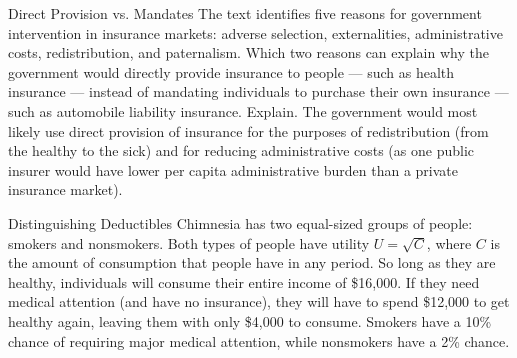 \documentclass[8pt]{extarticle}
\title{}
\author{Avinash Iyer}
\date{}
\begin{document}
  \begin{problem}{Direct Provision vs. Mandates}
    The text identifies five reasons for government intervention in insurance markets: adverse selection, externalities, administrative costs, redistribution, and paternalism. Which two reasons can explain why the government would directly provide insurance to people --- such as health insurance --- instead of mandating individuals to purchase their own insurance --- such as automobile liability insurance. Explain.
    \tcblower
    The government would most likely use direct provision of insurance for the purposes of redistribution (from the healthy to the sick) and for reducing administrative costs (as one public insurer would have lower per capita administrative burden than a private insurance market).
  \end{problem}
  \begin{problem}{Distinguishing Deductibles}
    Chimnesia has two equal-sized groups of people: smokers and nonsmokers. Both types of people have utility $U = \sqrt{C}$, where $C$ is the amount of consumption that people have in any period. So long as they are healthy, individuals will consume their entire income of \$16,000. If they need medical attention (and have no insurance), they will have to spend \$12,000 to get healthy again, leaving them with only \$4,000 to consume. Smokers have a 10\% chance of requiring major medical attention, while nonsmokers have a 2\% chance.\\


\end{problem}
\end{document}
